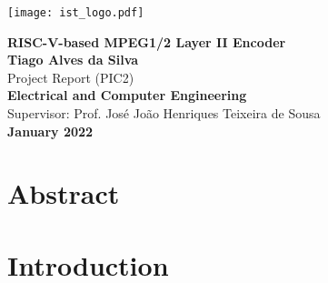 \documentclass[10pt]{esda}
\title{}
\author{}
\date{}
\begin{document}
\texttt{[image: ist\_logo.pdf]}

\thispagestyle{empty}

\begin{onehalfspace}

\begin{center}
\begin{Large}
  \vspace{4cm}
  {\bf \Large {RISC-V-based MPEG1/2 Layer II Encoder}}\\
  \vspace{2.5cm}
  {\bf \Large Tiago Alves da Silva}\\
  \vspace{2cm}
  \large {Project Report (PIC2)}\\
  \vspace{2mm}
  {\bf \Large {Electrical and Computer Engineering}}\\
  \vspace{2cm}
  \Large {Supervisor: Prof. José João Henriques Teixeira de Sousa}\\
  \vspace{1.5cm}
  \vspace{2cm}
  {\bf \Large January 2022 }
\end{Large}
\end{center}

\end{onehalfspace}


\cleardoublepage

\section*{Abstract}


\cleardoublepage
\tableofcontents
\listoftables
\listoffigures

\cleardoublepage


\cleardoublepage
\section{Introduction}
\label{sec:intro}

\end{document}
